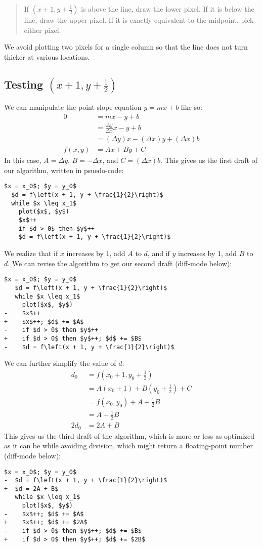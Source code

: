 \documentclass[12pt,letterpaper]{article}
\begin{document}
\begin{quote}
  If $\left(x + 1, y + \frac{1}{2}\right)$ is above the line, draw the lower pixel.
  If it is below the line, draw the upper pixel.
  If it is exactly equivalent to the midpoint, pick either pixel.
\end{quote}

We avoid plotting two pixels for a single column so that the line does not turn thicker at various locations.

\subsection{Testing $\left(x + 1, y + \frac{1}{2}\right)$}
We can manipulate the point-slope equation $y = mx + b$ like so:
\begin{align*}
  0       &= mx - y + b \\
          &= \frac{\Delta y}{\Delta x} x - y + b \\
          &= (\Delta y) x - (\Delta x) y + (\Delta x) b \\
  f(x, y) &= Ax + By + C
\end{align*}
In this case, $A = \Delta y$, $B = -\Delta x$, and $C = (\Delta x) b$.
This gives us the first draft of our algorithm, written in psuedo-code:
\begin{lstlisting}[mathescape]
  $x = x_0$; $y = y_0$
  $d = f\left(x + 1, y + \frac{1}{2}\right)$
  while $x \leq x_1$
    plot($x$, $y$)
    $x$++
    if $d > 0$ then $y$++
    $d = f\left(x + 1, y + \frac{1}{2}\right)$
\end{lstlisting}
We realize that if $x$ increases by 1, add $A$ to $d$, and if $y$ increases by 1, add $B$ to $d$.
We can revise the algorithm to get our second draft (diff-mode below):
\begin{lstlisting}[mathescape]
   $x = x_0$; $y = y_0$
   $d = f\left(x + 1, y + \frac{1}{2}\right)$
   while $x \leq x_1$
     plot($x$, $y$)
-    $x$++
+    $x$++; $d$ += $A$
-    if $d > 0$ then $y$++
+    if $d > 0$ then $y$++; $d$ += $B$
-    $d = f\left(x + 1, y + \frac{1}{2}\right)$
\end{lstlisting}
We can further simplify the value of $d$:
\begin{align*}
  d_0   &= f\left(x_0 + 1, y_0 + \frac{1}{2}\right) \\
        &= A(x_0 + 1) + B\left(y_0 + \frac{1}{2}\right) + C \\
        &= f(x_0, y_0) + A + \frac{1}{2} B \\
        &= A + \frac{1}{2} B \\
  2 d_0 &= 2A + B
\end{align*}
This gives us the third draft of the algorithm, which is more or less as optimized as it can be while avoiding division, which might return a floating-point number (diff-mode below):
\begin{lstlisting}[mathescape]
   $x = x_0$; $y = y_0$
-  $d = f\left(x + 1, y + \frac{1}{2}\right)$
+  $d = 2A + B$
   while $x \leq x_1$
     plot($x$, $y$)
-    $x$++; $d$ += $A$
+    $x$++; $d$ += $2A$
-    if $d > 0$ then $y$++; $d$ += $B$
+    if $d > 0$ then $y$++; $d$ += $2B$
\end{lstlisting}
\end{document}
